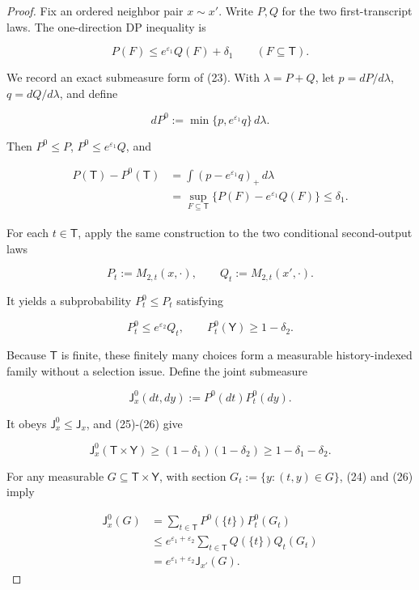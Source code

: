 \begin{proof}
Fix an ordered neighbor pair \(x\sim x'\). Write \(P,Q\) for
the two first-transcript laws. The one-direction DP inequality is

\[
 P(F)\leq e^{\varepsilon_1}Q(F)+\delta_1
 \qquad(F\subseteq\mathsf T).
\tag{23}
\]

We record an exact submeasure form of (23). With
\(\lambda=P+Q\), let \(p=dP/d\lambda\), \(q=dQ/d\lambda\), and define

\[
 dP^0:=\min\{p,e^{\varepsilon_1}q\}\,d\lambda.
\tag{24}
\]

Then \(P^0\leq P\), \(P^0\leq e^{\varepsilon_1}Q\), and

\[
\begin{aligned}
 P(\mathsf T)-P^0(\mathsf T)
 &=\int(p-e^{\varepsilon_1}q)_+\,d\lambda\\
 &=\sup_{F\subseteq\mathsf T}
   \{P(F)-e^{\varepsilon_1}Q(F)\}
 \leq\delta_1.
\end{aligned}
\tag{25}
\]

For each \(t\in\mathsf T\), apply the same construction to the two
conditional second-output laws

\[
 P_t:=M_{2,t}(x,\cdot),
 \qquad Q_t:=M_{2,t}(x',\cdot).
\]

It yields a subprobability \(P_t^0\leq P_t\) satisfying

\[
 P_t^0\leq e^{\varepsilon_2}Q_t,
 \qquad
 P_t^0(\mathsf Y)\geq1-\delta_2.
\tag{26}
\]

Because \(\mathsf T\) is finite, these finitely many choices form a
measurable history-indexed family without a selection issue. Define the
joint submeasure

\[
 \mathsf J_x^0(dt,dy):=P^0(dt)P_t^0(dy).
\tag{27}
\]

It obeys \(\mathsf J_x^0\leq\mathsf J_x\), and (25)-(26) give

\[
 \mathsf J_x^0(\mathsf T\times\mathsf Y)
 \geq(1-\delta_1)(1-\delta_2)
 \geq1-\delta_1-\delta_2.
\tag{28}
\]

For any measurable \(G\subseteq\mathsf T\times\mathsf Y\), with section
\(G_t:=\{y:(t,y)\in G\}\), (24) and (26) imply

\[
\begin{aligned}
 \mathsf J_x^0(G)
 &=\sum_{t\in\mathsf T}P^0(\{t\})P_t^0(G_t)\\
 &\leq e^{\varepsilon_1+\varepsilon_2}
   \sum_{t\in\mathsf T}Q(\{t\})Q_t(G_t)\\
 &=e^{\varepsilon_1+\varepsilon_2}\mathsf J_{x'}(G).
\end{aligned}
\tag{29}
\]


\end{proof}
